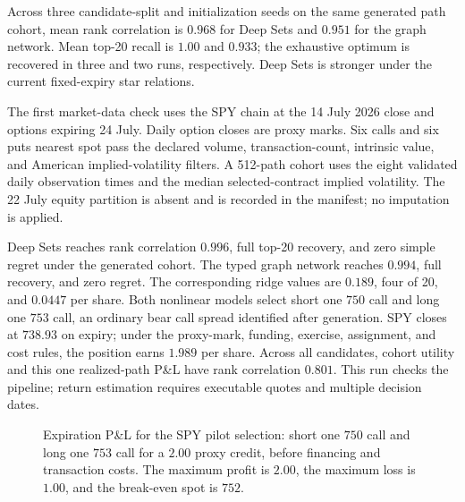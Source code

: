 \documentclass{strategynet-journal}
\begin{document}
Across three candidate-split and initialization seeds on the same generated
path cohort, mean rank correlation is \(0.968\) for Deep Sets and \(0.951\)
for the graph network.  Mean top-20 recall is \(1.00\) and \(0.933\);
the exhaustive optimum is recovered in three and two runs, respectively.
Deep Sets is stronger under the current fixed-expiry star relations.

The first market-data check uses the SPY chain at the 14 July 2026 close and
options expiring 24 July.  Daily option closes are proxy marks.  Six calls and
six puts nearest spot pass the declared volume, transaction-count, intrinsic
value, and American implied-volatility filters.  A 512-path cohort uses the
eight validated daily observation times and the median selected-contract
implied volatility.  The 22 July equity partition is absent and is recorded in
the manifest; no imputation is applied.

Deep Sets reaches rank correlation \(0.996\), full top-20 recovery, and zero
simple regret under the generated cohort.  The typed graph network reaches
\(0.994\), full recovery, and zero regret.  The corresponding ridge values
are \(0.189\), four of 20, and \(0.0447\) per share.  Both nonlinear models
select short one \(750\) call and long one \(753\) call, an ordinary bear call
spread identified after generation.  SPY closes at \(738.93\) on expiry;
under the proxy-mark, funding, exercise, assignment, and cost rules, the
position earns \(1.989\) per share.  Across all candidates, cohort utility
and this one realized-path P\&L have rank correlation \(0.801\).  This run
checks the pipeline; return estimation requires executable quotes and
multiple decision dates.

\begin{figure}[H]
  \centering
  \caption{Expiration P\&L for the SPY pilot selection: short one \(750\)
  call and long one \(753\) call for a \(2.00\) proxy credit, before financing
  and transaction costs.  The maximum profit is \(2.00\), the maximum loss is
  \(1.00\), and the break-even spot is \(752\).}
  \label{fig:spy-pilot-payoff}
\end{figure}
\end{document}
